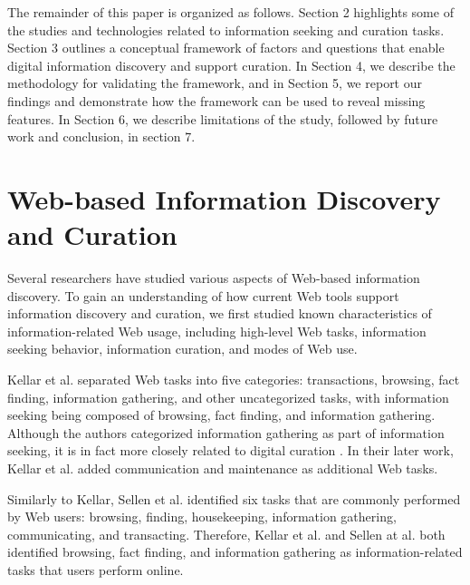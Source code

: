 \documentclass{casconpaper}
\begin{document}
{The remainder of this paper is organized as follows. Section 2 highlights some of the studies and technologies related to information seeking and curation tasks. Section 3 outlines a conceptual framework of factors and questions that enable digital information discovery and support curation. In Section 4, we describe the methodology for validating the framework, and in Section 5, we report our findings and demonstrate how the framework can be used to reveal missing features. In Section 6, we describe limitations of the study, followed by future work and conclusion, in section 7.

} %


{\section{Web-based Information Discovery and Curation}

Several researchers have studied various aspects of Web-based information discovery. To gain an understanding of how current Web tools support information discovery and curation, we first studied known characteristics of information-related Web usage, including high-level Web tasks, information seeking behavior, information curation, and modes of Web use. 

Kellar et al. \cite{kellar2006} separated Web tasks into five categories: transactions, browsing, fact finding, information gathering, and other uncategorized tasks, with information seeking being composed of browsing, fact finding, and information gathering. Although the authors categorized information gathering as part of information seeking, it is in fact more closely related to digital curation \cite{beagrie, wittaker}. In their later work, Kellar et al. \cite{kellar2007} added communication and maintenance as additional Web tasks. 

Similarly to Kellar, Sellen et al. \cite{sellen} identified six tasks that are commonly performed by Web users: browsing, finding, housekeeping, information gathering, communicating, and transacting. Therefore, Kellar et al. and Sellen at al. both identified browsing, fact finding, and information gathering as information-related tasks that users perform online.   

}
\end{document}
